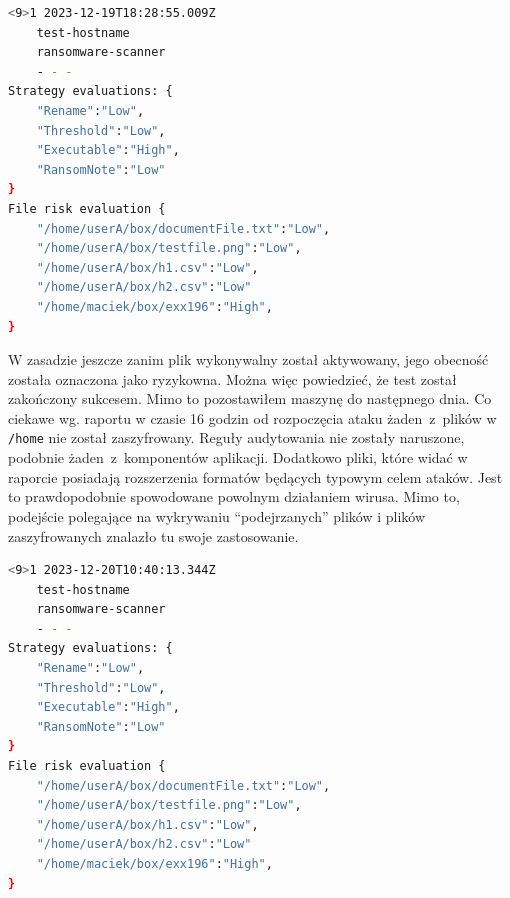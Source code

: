 \begin{lstlisting}[language=bash,
    backgroundcolor=\color{EEGold!5!white},
    caption={Pierwszy raport~z~ataku Ransom EXX.},
    label={lst:raportau}]
    <9>1 2023-12-19T18:28:55.009Z
    test-hostname 
    ransomware-scanner 
    - - -  
Strategy evaluations: {
    "Rename":"Low",
    "Threshold":"Low",
    "Executable":"High",
    "RansomNote":"Low"
}
File risk evaluation {
    "/home/userA/box/documentFile.txt":"Low",
    "/home/userA/box/testfile.png":"Low",
    "/home/userA/box/h1.csv":"Low",
    "/home/userA/box/h2.csv":"Low"
    "/home/maciek/box/exx196":"High",
}
\end{lstlisting}
W zasadzie jeszcze zanim plik wykonywalny został aktywowany, jego obecność została oznaczona jako ryzykowna. Można więc powiedzieć, że test został zakończony sukcesem. Mimo to pozostawiłem maszynę do następnego dnia. Co ciekawe wg. raportu w czasie 16 godzin od rozpoczęcia ataku żaden~z~plików w \texttt{/home} nie został zaszyfrowany.
Reguły audytowania nie zostały naruszone, podobnie żaden~z~komponentów aplikacji. Dodatkowo pliki, które widać w raporcie posiadają rozszerzenia formatów będących typowym celem ataków. Jest to prawdopodobnie spowodowane powolnym działaniem wirusa.  Mimo to, podejście polegające na wykrywaniu \enquote{podejrzanych} plików i plików zaszyfrowanych znalazło tu swoje zastosowanie.
\begin{lstlisting}[language=bash,
    backgroundcolor=\color{EEGold!5!white},
    caption={Drugi raport~z~ataku Ransom EXX.},
    label={lst:raportau}]
    <9>1 2023-12-20T10:40:13.344Z
    test-hostname 
    ransomware-scanner 
    - - -  
Strategy evaluations: {
    "Rename":"Low",
    "Threshold":"Low",
    "Executable":"High",
    "RansomNote":"Low"
}
File risk evaluation {
    "/home/userA/box/documentFile.txt":"Low",
    "/home/userA/box/testfile.png":"Low",
    "/home/userA/box/h1.csv":"Low",
    "/home/userA/box/h2.csv":"Low"
    "/home/maciek/box/exx196":"High",
}
\end{lstlisting}
%
%
